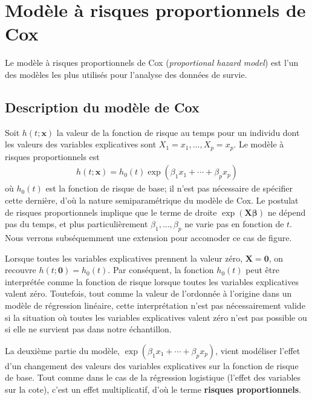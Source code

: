 \documentclass[
  11pt,
  letterpaper,
]{scrbook}
\theoremstyle{definition}
\theoremstyle{remark}
\begin{document}
\hypertarget{moduxe8le-uxe0-risques-proportionnels-de-cox}{%
\section{Modèle à risques proportionnels de
Cox}\label{moduxe8le-uxe0-risques-proportionnels-de-cox}}

Le modèle à risques proportionnels de Cox (\emph{proportional hazard
model}) est l'un des modèles les plus utilisés pour l'analyse des
données de survie.

\hypertarget{description-du-moduxe8le-de-cox}{%
\subsection{Description du modèle de
Cox}\label{description-du-moduxe8le-de-cox}}

Soit \(h(t; \boldsymbol{x})\) la valeur de la fonction de risque au
temps pour un individu dont les valeurs des variables explicatives sont
\(X_1=x_1, \ldots, X_p=x_p\). Le modèle à risques proportionnels est
\begin{align*}
h(t; \boldsymbol{x}) = h_0(t)\exp(\beta_1x_1 + \cdots + \beta_p x_p)
\end{align*} où \(h_0(t)\) est la fonction de risque de base; il n'est
pas nécessaire de spécifier cette dernière, d'où la nature
semiparamétrique du modèle de Cox. Le postulat de risques proportionnels
implique que le terme de droite \(\exp(\mathbf{X}\boldsymbol{\beta})\)
ne dépend pas du temps, et plus particulièrement
\(\beta_1, \ldots, \beta_p\) ne varie pas en fonction de \(t\). Nous
verrons subséquemment une extension pour accomoder ce cas de figure.

Lorsque toutes les variables explicatives prennent la valeur zéro,
\(\boldsymbol{X}=\boldsymbol{0}\), on recouvre
\(h(t; \boldsymbol{0})= h_0(t)\). Par conséquent, la fonction \(h_0(t)\)
peut être interprétée comme la fonction de risque lorsque toutes les
variables explicatives valent zéro. Toutefois, tout comme la valeur de
l'ordonnée à l'origine dans un modèle de régression linéaire, cette
interprétation n'est pas nécessairement valide si la situation où toutes
les variables explicatives valent zéro n'est pas possible ou si elle ne
survient pas dans notre échantillon.

La deuxième partie du modèle,
\(\exp(\beta_1x_1 + \cdots + \beta_p x_p)\), vient modéliser l'effet
d'un changement des valeurs des variables explicatives sur la fonction
de risque de base. Tout comme dans le cas de la régression logistique
(l'effet des variables sur la cote), c'est un effet multiplicatif, d'où
le terme \textbf{risques proportionnels}.
\end{document}
